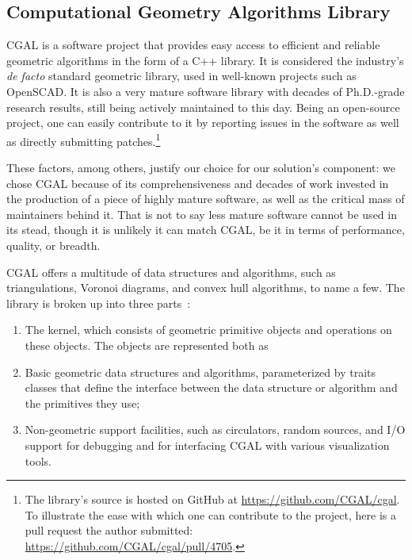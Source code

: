 \subsection{Computational Geometry Algorithms Library}%
\label{sec:solution.impl.cgal}

\Ac{CGAL} is a software project that provides easy access to efficient and
reliable geometric algorithms in the form of a C++ library.  It is considered
the industry's \textit{de facto} standard geometric library, used in well-known
projects such as OpenSCAD\@.  It is also a very mature software library with
decades of Ph.D.-grade research results, still being actively maintained to this
day.  Being an open-source project, one can easily contribute to it by reporting
issues in the software as well as directly submitting patches.\footnote{The
library's source is hosted on GitHub at \url{https://github.com/CGAL/cgal}.  To
illustrate the ease with which one can contribute to the project, here is a pull
request the author submitted: \url{https://github.com/CGAL/cgal/pull/4705}.}

These factors, among others, justify our choice for our solution's
\geomlibrary{} component: we chose \ac{CGAL} because of its comprehensiveness
and decades of work invested in the production of a piece of highly mature
software, as well as the critical mass of maintainers behind it.  That is not to
say less mature software cannot be used in its stead, though it is unlikely it
can match \ac{CGAL}, be it in terms of performance, quality, or breadth.

\ac{CGAL} offers a multitude of data structures and algorithms, such as
triangulations, Voronoi diagrams, and convex hull algorithms, to name a few.
The library is broken up into three parts~\cite{CGAL:5.3:23LGK}:
\begin{enumerate}
  \item The kernel, which consists of geometric primitive objects and operations
  on these objects.  The objects are represented both as
  \item Basic geometric data structures and algorithms, parameterized by traits
  classes that define the interface between the data structure or algorithm and
  the primitives they use;
  \item Non-geometric support facilities, such as circulators, random sources,
  and I/O support for debugging and for interfacing \ac{CGAL} with various
  visualization tools.
\end{enumerate}

